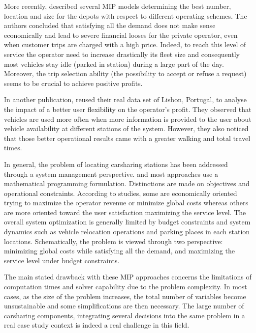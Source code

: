 \begin{bibunit}[ieeetr]
\medskip
More recently, \cite{correia_optimization_2012} described several MIP models determining the best number, location and size for the depots with respect to different operating schemes.
The authors concluded that satisfying all the demand does not make sense economically and lead to severe financial looses for the private operator, even when customer trips are charged with a high price.
Indeed, to reach this level of service the operator need to increase drastically its fleet size and consequently most vehicles stay idle (parked in station) during a large part of the day.
Moreover, the trip selection ability (\ie the possibility to accept or refuse a request) seems to be crucial to achieve positive profits.

In another publication, \cite{correia_added_2014} reused their real data set of Lisbon, Portugal, to analyse the impact of a better user flexibility on the operator's profit.
They observed that vehicles are used more often when more information is provided to the user about vehicle availability at different stations of the system.
However, they also noticed that those better operational results came with a greater walking and total travel times.


\medskip
In general, the problem of locating carsharing stations has been addressed through a system management perspective.
and most approaches use a mathematical programming formulation.
Distinctions are made on objectives and operational constraints.
According to studies, some are economically oriented trying to maximize the operator revenue or minimize global costs whereas others are more oriented toward the user satisfaction maximizing the service level.
The overall system optimization is generally limited by budget constraints and system dynamics such as vehicle relocation operations and parking places in each station locations.
Schematically, the problem is viewed through two perspective: minimizing global costs while satisfying all the demand, and maximizing the service level under budget constraints.

\medskip
The main stated drawback with these MIP approaches concerns the limitations of computation times and solver capability due to the problem complexity.
In most cases, as the size of the problem increases, the total number of variables become unsustainable and some simplifications are then necessary.
The large number of carsharing components, integrating several decisions into the same problem in a real case study context is indeed a real challenge in this field.


\end{bibunit}
